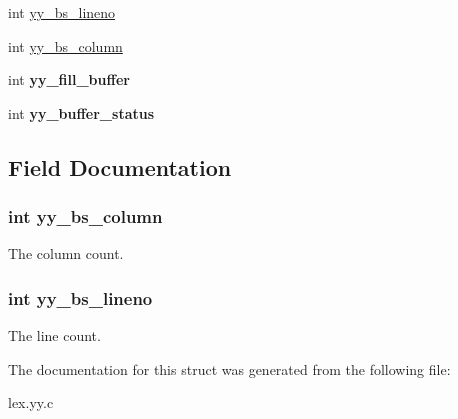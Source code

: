 \begin{DoxyCompactItemize}
\item 
int \hyperlink{structyy__buffer__state_a59c414c619ca0071fe3a091336106d82}{yy\_\-bs\_\-lineno}
\item 
int \hyperlink{structyy__buffer__state_ad9867983bbc1666304d83623cd6e3dd8}{yy\_\-bs\_\-column}
\item 
\hypertarget{structyy__buffer__state_a5e492694db97a0d7760d8cc5fd058dfd}{
int {\bfseries yy\_\-fill\_\-buffer}}
\label{structyy__buffer__state_a5e492694db97a0d7760d8cc5fd058dfd}

\item 
\hypertarget{structyy__buffer__state_a6ca09e676a787676260c558a0f731285}{
int {\bfseries yy\_\-buffer\_\-status}}
\label{structyy__buffer__state_a6ca09e676a787676260c558a0f731285}

\end{DoxyCompactItemize}


\subsection{Field Documentation}
\hypertarget{structyy__buffer__state_ad9867983bbc1666304d83623cd6e3dd8}{
\subsubsection[{yy\_\-bs\_\-column}]{\setlength{\rightskip}{0pt plus 5cm}int {\bf yy\_\-bs\_\-column}}}
\label{structyy__buffer__state_ad9867983bbc1666304d83623cd6e3dd8}
The column count. \hypertarget{structyy__buffer__state_a59c414c619ca0071fe3a091336106d82}{
\subsubsection[{yy\_\-bs\_\-lineno}]{\setlength{\rightskip}{0pt plus 5cm}int {\bf yy\_\-bs\_\-lineno}}}
\label{structyy__buffer__state_a59c414c619ca0071fe3a091336106d82}
The line count. 

The documentation for this struct was generated from the following file:\begin{DoxyCompactItemize}
\item 
lex.yy.c\end{DoxyCompactItemize}
